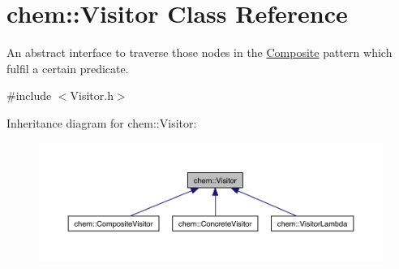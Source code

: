 \hypertarget{classchem_1_1Visitor}{\section{chem\-:\-:Visitor Class Reference}
\label{classchem_1_1Visitor}
}


An abstract interface to traverse those nodes in the \hyperlink{classchem_1_1Composite}{Composite} pattern which fulfil a certain predicate.  




{\ttfamily \#include $<$Visitor.\-h$>$}



Inheritance diagram for chem\-:\-:Visitor\-:
\nopagebreak
\begin{figure}[H]
\begin{center}
\leavevmode
\includegraphics[width=350pt]{classchem_1_1Visitor__inherit__graph}
\end{center}
\end{figure}
